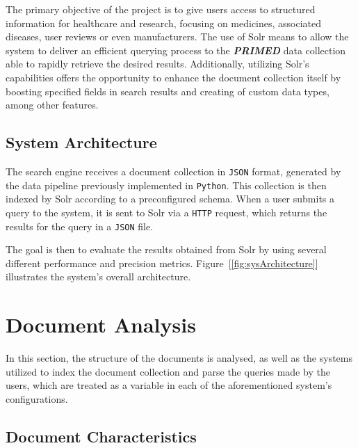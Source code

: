 \documentclass[sigconf]{acmart}
\begin{document}
The primary objective of the project is to give users access to structured information for healthcare and research, focusing on medicines, associated diseases, user reviews or even manufacturers.
The use of Solr means to allow the system to deliver an efficient querying process to the \textit{\textbf{PRIMED}} data collection able to rapidly retrieve the desired results. 
Additionally, utilizing Solr's capabilities offers the opportunity to enhance the document collection itself by boosting specified fields in search results and creating of custom data types, among other features.

\subsection{System Architecture}

The search engine receives a document collection in \texttt{JSON} format, generated by the data pipeline previously implemented in \texttt{Python}. This collection is then indexed by Solr according to a preconfigured schema\cite{schema}. When a user submits a query to the system, it is sent to Solr via a \texttt{HTTP} request\cite{http}, which returns the results for the query in a \texttt{JSON} file.

The goal is then to evaluate the results obtained from Solr by using several different performance and precision metrics. Figure~[\ref{fig:sysArchitecture}] illustrates the system's overall architecture.

\section{Document Analysis}

In this section, the structure of the documents is analysed, as well as the systems utilized to index the document collection and parse the queries made by the users, which are treated as a variable in each of the aforementioned system's configurations.

\subsection{Document Characteristics}
\end{document}
